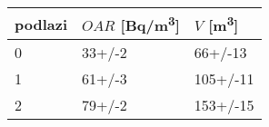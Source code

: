 \begin{tabular}{lll}
\toprule
podlazi & $OAR$ [\si{Bq/m^3}] & $V$ [\si{m^3}] \\
\midrule
0 &              33+/-2 &        66+/-13 \\
1 &              61+/-3 &       105+/-11 \\
2 &              79+/-2 &       153+/-15 \\
\bottomrule
\end{tabular}
